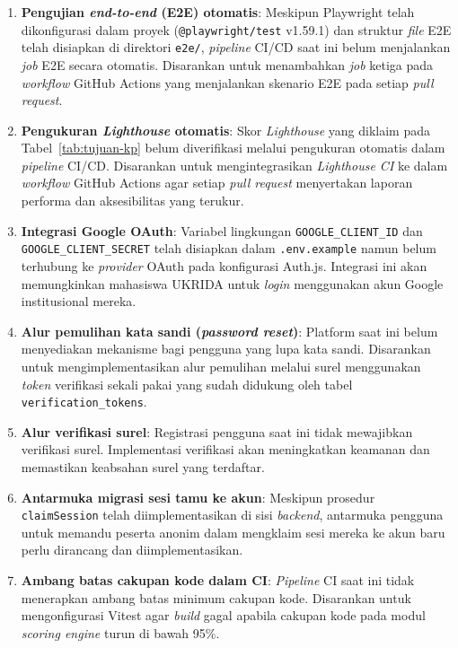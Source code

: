 \begin{enumerate}[leftmargin=2cm]
  \item \textbf{Pengujian \textit{end-to-end} (E2E) otomatis}: Meskipun Playwright telah dikonfigurasi dalam proyek (\texttt{@playwright/test} v1.59.1) dan struktur \textit{file} E2E telah disiapkan di direktori \texttt{e2e/}, \textit{pipeline} CI/CD saat ini belum menjalankan \textit{job} E2E secara otomatis. Disarankan untuk menambahkan \textit{job} ketiga pada \textit{workflow} GitHub Actions yang menjalankan skenario E2E pada setiap \textit{pull request}.

  \item \textbf{Pengukuran \textit{Lighthouse} otomatis}: Skor \textit{Lighthouse} yang diklaim pada Tabel~\ref{tab:tujuan-kp} belum diverifikasi melalui pengukuran otomatis dalam \textit{pipeline} CI/CD. Disarankan untuk mengintegrasikan \textit{Lighthouse CI} ke dalam \textit{workflow} GitHub Actions agar setiap \textit{pull request} menyertakan laporan performa dan aksesibilitas yang terukur.

  \item \textbf{Integrasi Google OAuth}: Variabel lingkungan \texttt{GOOGLE\_CLIENT\_ID} dan \texttt{GOOGLE\_CLIENT\_SECRET} telah disiapkan dalam \texttt{.env.example} namun belum terhubung ke \textit{provider} OAuth pada konfigurasi Auth.js. Integrasi ini akan memungkinkan mahasiswa UKRIDA untuk \textit{login} menggunakan akun Google institusional mereka.

  \item \textbf{Alur pemulihan kata sandi (\textit{password reset})}: Platform saat ini belum menyediakan mekanisme bagi pengguna yang lupa kata sandi. Disarankan untuk mengimplementasikan alur pemulihan melalui surel menggunakan \textit{token} verifikasi sekali pakai yang sudah didukung oleh tabel \texttt{verification\_tokens}.

  \item \textbf{Alur verifikasi surel}: Registrasi pengguna saat ini tidak mewajibkan verifikasi surel. Implementasi verifikasi akan meningkatkan keamanan dan memastikan keabsahan surel yang terdaftar.

  \item \textbf{Antarmuka migrasi sesi tamu ke akun}: Meskipun prosedur \texttt{claimSession} telah diimplementasikan di sisi \textit{backend}, antarmuka pengguna untuk memandu peserta anonim dalam mengklaim sesi mereka ke akun baru perlu dirancang dan diimplementasikan.

  \item \textbf{Ambang batas cakupan kode dalam CI}: \textit{Pipeline} CI saat ini tidak menerapkan ambang batas minimum cakupan kode. Disarankan untuk mengonfigurasi Vitest agar \textit{build} gagal apabila cakupan kode pada modul \textit{scoring engine} turun di bawah 95\%.


\end{enumerate}
